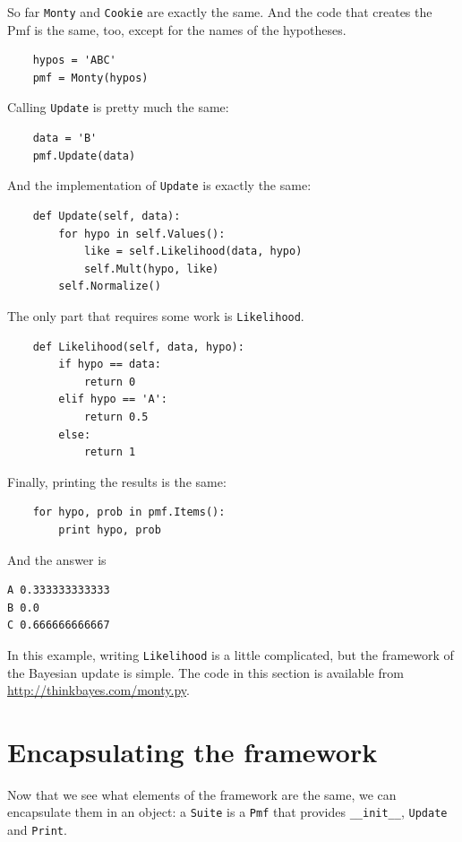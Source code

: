 \documentclass[12pt]{book}
\begin{document}
So far \verb"Monty" and \verb"Cookie" are exactly the same.
And the code that creates the Pmf is the same, too, except for
the names of the hypotheses.

\begin{verbatim}
    hypos = 'ABC'
    pmf = Monty(hypos)
\end{verbatim}

Calling \verb"Update" is pretty much the same:

\begin{verbatim}
    data = 'B'
    pmf.Update(data)
\end{verbatim}

And the implementation of \verb"Update" is exactly the same:

\begin{verbatim}
    def Update(self, data):
        for hypo in self.Values():
            like = self.Likelihood(data, hypo)
            self.Mult(hypo, like)
        self.Normalize()
\end{verbatim}

The only part that requires some work is \verb"Likelihood".

\begin{verbatim}
    def Likelihood(self, data, hypo):
        if hypo == data:
            return 0
        elif hypo == 'A':
            return 0.5
        else:
            return 1
\end{verbatim}

Finally, printing the results is the same:

\begin{verbatim}
    for hypo, prob in pmf.Items():
        print hypo, prob
\end{verbatim}

And the answer is

\begin{verbatim}
A 0.333333333333
B 0.0
C 0.666666666667
\end{verbatim}

In this example, writing \verb"Likelihood" is a little complicated,
but the framework of the Bayesian update is simple.  The code in
this section is available from \url{http://thinkbayes.com/monty.py}.


\section{Encapsulating the framework}

Now that we see what elements of the framework are the same, we
can encapsulate them in an object: a \verb"Suite" is a \verb"Pmf"
that provides \verb"__init__", \verb"Update" and \verb"Print".
\end{document}
